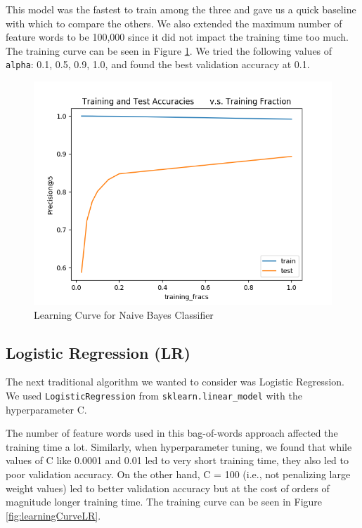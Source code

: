 \documentclass{sig-alternate-05-2015}
\begin{document}
This model was the fastest to train among the three and gave us a quick baseline with which to compare the others. We also extended the maximum number of feature words to be 100,000 since it did not impact the training time too much. The training curve can be seen in Figure \ref{fig:learningCurveNBC}. We tried the following values of \verb+alpha+: 0.1, 0.5, 0.9, 1.0, and found the best validation accuracy at 0.1.

\begin{figure}[H]
\centering
\includegraphics[width=\linewidth]{plots/learning_curve_nbc.png}
\caption{Learning Curve for Naive Bayes Classifier}
\label{fig:learningCurveNBC}
\end{figure}

\subsection{Logistic Regression (LR)}

The next traditional algorithm we wanted to consider was Logistic Regression. We used \verb+LogisticRegression+ from \verb+sklearn.linear_model+ with the hyperparameter C.

The number of feature words used in this bag-of-words \cite{logistic-regression:bag-of-words} approach affected the training time a lot. Similarly, when hyperparameter tuning, we found that while values of C like 0.0001 and 0.01 led to very short training time, they also led to poor validation accuracy. On the other hand, C = 100 (i.e., not penalizing large weight values) led to better validation accuracy but at the cost of orders of magnitude longer training time. The training curve can be seen in Figure \ref{fig:learningCurveLR}.
\end{document}
